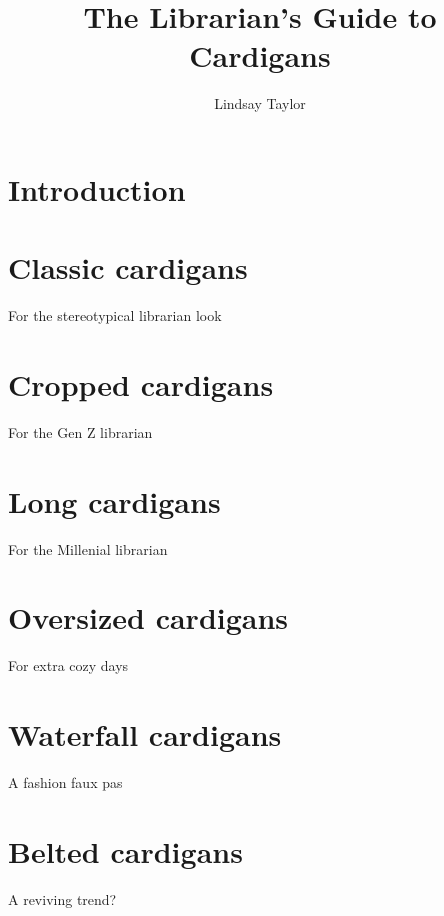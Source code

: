 \documentclass[
  openany]{book}
\title{The Librarian's Guide to Cardigans}
\author{Lindsay Taylor}
\date{}
\begin{document}
\maketitle

{
\setcounter{tocdepth}{1}
\tableofcontents
}
\hypertarget{introduction}{%
\chapter{Introduction}\label{introduction}}

\hypertarget{classic-cardigans}{%
\chapter{Classic cardigans}\label{classic-cardigans}}

For the stereotypical librarian look

\hypertarget{cropped-cardigans}{%
\chapter{Cropped cardigans}\label{cropped-cardigans}}

For the Gen Z librarian

\hypertarget{long-cardigans}{%
\chapter{Long cardigans}\label{long-cardigans}}

For the Millenial librarian

\hypertarget{oversized-cardigans}{%
\chapter{Oversized cardigans}\label{oversized-cardigans}}

For extra cozy days

\hypertarget{waterfall-cardigans}{%
\chapter{Waterfall cardigans}\label{waterfall-cardigans}}

A fashion faux pas

\hypertarget{belted-cardigans}{%
\chapter{Belted cardigans}\label{belted-cardigans}}

A reviving trend?
\end{document}
